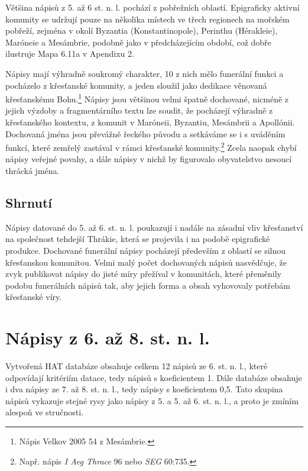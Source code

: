 \NC\AR
\HL
\HL
\stoptable

Většina nápisů z 5. až 6 st. n. l. pochází z pobřežních oblastí. Epigraficky aktivní komunity se udržují pouze na několika místech ve třech regionech na mořském pobřeží, zejména v okolí Byzantia (Konstantinopole), Perinthu (Hérakleie), Maróneie a Mesámbrie, podobně jako v předcházejícím období, což dobře ilustruje Mapa 6.11a v Apendixu 2.

Nápisy mají výhradně soukromý charakter, 10 z nich mělo funerální funkci a pocházelo z křesťanské komunity, a jeden sloužil jako dedikace věnovaná křesťanskému Bohu.\footnote{Nápis Velkov 2005 54 z Mesámbrie.} Nápisy jsou většinou velmi špatně dochované, nicméně z jejich výzdoby a fragmentárního textu lze soudit, že pocházejí výhradně z křesťanského kontextu, z komunit v Maróneii, Byzantiu, Mesámbrii a Apollónii. Dochovaná jména jsou převážně řeckého původu a setkáváme se i s uváděním funkcí, které zemřelý zastával v rámci křesťanské komunity.\footnote{Např. nápis {\em I Aeg Thrace} 96 nebo {\em SEG} 60:735.} Zcela naopak chybí nápisy veřejné povahy, a dále nápisy v nichž by figurovalo obyvatelstvo nesoucí thrácká jména.

\subsection[shrnutí-24]{Shrnutí}

Nápisy datované do 5. až 6. st. n. l. poukazují i nadále na zásadní vliv křesťanství na společnost tehdejší Thrákie, která se projevila i na podobě epigrafické produkce. Dochované funerální nápisy pocházejí především z oblastí se silnou křesťanskou komunitou. Velmi malý počet dochovaných nápisů nasvědčuje, že zvyk publikovat nápisy do jisté míry přežíval v komunitách, které přeměnily podobu funerálních nápisů tak, aby jejich forma a obsah vyhovovaly potřebám křesťanské víry.

\section[nápisy-z-6.-až-8.-st.-n.-l.]{Nápisy z 6. až 8. st. n. l.}

Vytvořená HAT databáze obsahuje celkem 12 nápisů ze 6. st. n. l., které odpovídají kritériím datace, tedy nápisů s koeficientem 1. Dále databáze obsahuje i dva nápisy ze 7. až 8. st. n. l., tedy nápisy s koeficientem 0,5. Tato skupina nápisů vykazuje stejné rysy jako nápisy z 5. a 5. až 6. st. n. l., a proto je zmíním alespoň ve stručnosti.

